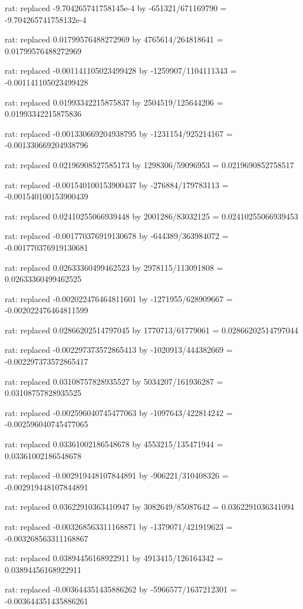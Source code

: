 \documentclass[a4paper,10pt]{article}
\begin{document}
\begin{eulernotebook}
\begin{eulercomment}
\begin{eulercomment}
\begin{eulercomment}
\begin{eulercomment}
\begin{eulercomment}
\begin{eulercomment}
\begin{eulercomment}
\begin{eulercomment}
\begin{eulercomment}
\begin{eulercomment}
\begin{eulercomment}
\begin{eulercomment}
\begin{eulercomment}
\begin{eulercomment}
\begin{eulercomment}
\begin{eulercomment}
\begin{euleroutput}
  rat: replaced -9.704265741758145e-4 by -651321/671169790 = -9.704265741758132e-4
  
  rat: replaced 0.01799576488272969 by 4765614/264818641 = 0.01799576488272969
  
  rat: replaced -0.001141105023499428 by -1259907/1104111343 = -0.001141105023499428
  
  rat: replaced 0.01993342215875837 by 2504519/125644206 = 0.01993342215875836
  
  rat: replaced -0.001330669204938795 by -1231154/925214167 = -0.001330669204938796
  
  rat: replaced 0.02196908527585173 by 1298306/59096953 = 0.0219690852758517
  
  rat: replaced -0.001540100153900437 by -276884/179783113 = -0.001540100153900439
  
  rat: replaced 0.02410255066939448 by 2001286/83032125 = 0.02410255066939453
  
  rat: replaced -0.001770376919130678 by -644389/363984072 = -0.001770376919130681
  
  rat: replaced 0.02633360499462523 by 2978115/113091808 = 0.02633360499462525
  
  rat: replaced -0.002022476464811601 by -1271955/628909667 = -0.002022476464811599
  
  rat: replaced 0.02866202514797045 by 1770713/61779061 = 0.02866202514797044
  
  rat: replaced -0.002297373572865413 by -1020913/444382669 = -0.002297373572865417
  
  rat: replaced 0.03108757828935527 by 5034207/161936287 = 0.03108757828935525
  
  rat: replaced -0.002596040745477063 by -1097643/422814242 = -0.002596040745477065
  
  rat: replaced 0.03361002186548678 by 4553215/135471944 = 0.03361002186548678
  
  rat: replaced -0.002919448107844891 by -906221/310408326 = -0.002919448107844891
  
  rat: replaced 0.03622910363410947 by 3082649/85087642 = 0.0362291036341094
  
  rat: replaced -0.003268563311168871 by -1379071/421919623 = -0.003268563311168867
  
  rat: replaced 0.03894456168922911 by 4913415/126164342 = 0.03894456168922911
  
  rat: replaced -0.003644351435886262 by -5966577/1637212301 = -0.003644351435886261
  

\end{euleroutput}
\end{eulercomment}
\end{eulercomment}
\end{eulercomment}
\end{eulercomment}
\end{eulercomment}
\end{eulercomment}
\end{eulercomment}
\end{eulercomment}
\end{eulercomment}
\end{eulercomment}
\end{eulercomment}
\end{eulercomment}
\end{eulercomment}
\end{eulercomment}
\end{eulercomment}
\end{eulercomment}
\end{eulernotebook}
\end{document}

